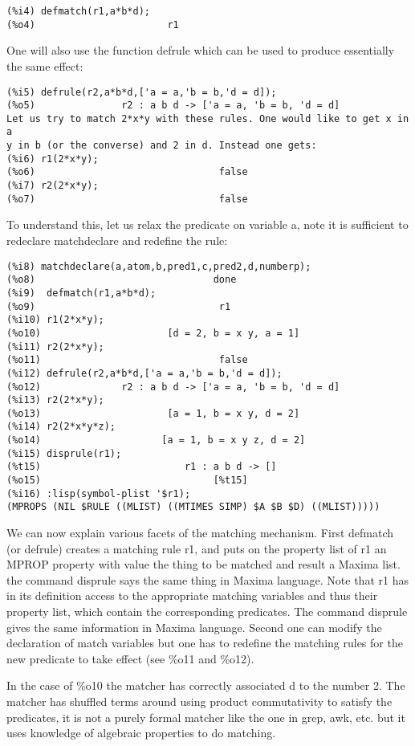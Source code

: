 \documentclass[a4paper,11pt]{article}
\begin{document}
\begin{verbatim}
(%i4) defmatch(r1,a*b*d);
(%o4)                       r1
\end{verbatim}                                
One will also use the function defrule which can be used to produce 
essentially the same effect:
\begin{verbatim}
(%i5) defrule(r2,a*b*d,['a = a,'b = b,'d = d]);
(%o5)               r2 : a b d -> ['a = a, 'b = b, 'd = d]
Let us try to match 2*x*y with these rules. One would like to get x in a
y in b (or the converse) and 2 in d. Instead one gets:
(%i6) r1(2*x*y);
(%o6)                                false
(%i7) r2(2*x*y);
(%o7)                                false
\end{verbatim}
To understand this, let us relax the predicate on variable a, note
it is sufficient to redeclare matchdeclare and redefine the rule:
\begin{verbatim}
(%i8) matchdeclare(a,atom,b,pred1,c,pred2,d,numberp);
(%o8)                               done
(%i9)  defmatch(r1,a*b*d);
(%o9)                                r1
(%i10) r1(2*x*y);
(%o10)                      [d = 2, b = x y, a = 1]
(%i11) r2(2*x*y);
(%o11)                               false
(%i12) defrule(r2,a*b*d,['a = a,'b = b,'d = d]);
(%o12)              r2 : a b d -> ['a = a, 'b = b, 'd = d]
(%i13) r2(2*x*y);
(%o13)                      [a = 1, b = x y, d = 2]
(%i14) r2(2*x*y*z);
(%o14)                     [a = 1, b = x y z, d = 2]
(%i15) disprule(r1);
(%t15)                         r1 : a b d -> []
(%o15)                              [%t15]
(%i16) :lisp(symbol-plist '$r1);
(MPROPS (NIL $RULE ((MLIST) ((MTIMES SIMP) $A $B $D) ((MLIST)))))
\end{verbatim}

We can now explain various facets of the matching mechanism.  First
defmatch (or defrule) creates a matching rule r1, and puts on the
property list of r1 an MPROP property with value the thing to be
matched and result a Maxima list. the command disprule says the same
thing in Maxima language.  Note that r1 has in its definition access
to the appropriate matching variables and thus their property list,
which contain the corresponding predicates. The command disprule gives
the same information in Maxima language. Second one can modify the
declaration of match variables but one has to redefine the matching
rules for the new predicate to take effect (see \%o11 and \%o12).  

In the case of \%o10 the matcher has correctly associated d to the
number 2.  The matcher has shuffled terms around using product
commutativity to satisfy the predicates, it is not a purely formal
matcher like the one in grep, awk, etc. but it uses knowledge of
algebraic properties to do matching.
\end{document}
